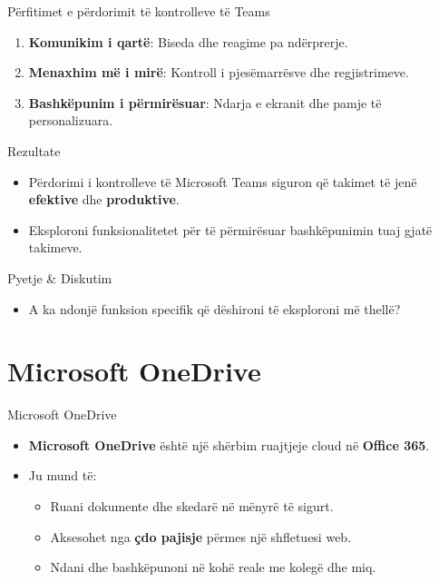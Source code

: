 \documentclass[
  ignorenonframetext,
]{beamer}
\providecommand{\tightlist}{%
  \setlength{\itemsep}{0pt}\setlength{\parskip}{0pt}}
\begin{document}
\begin{frame}{Përfitimet e përdorimit të kontrolleve të Teams}
\label{puxebrfitimet-e-puxebrdorimit-tuxeb-kontrolleve-tuxeb-teams}
\begin{enumerate}
\item
  \textbf{Komunikim i qartë}: Biseda dhe reagime pa ndërprerje.
\item
  \textbf{Menaxhim më i mirë}: Kontroll i pjesëmarrësve dhe
  regjistrimeve.
\item
  \textbf{Bashkëpunim i përmirësuar}: Ndarja e ekranit dhe pamje të
  personalizuara.
\end{enumerate}
\end{frame}

\begin{frame}{Rezultate}
\label{rezultate-6}
\begin{itemize}
\item
  Përdorimi i kontrolleve të Microsoft Teams siguron që takimet të jenë
  \textbf{efektive} dhe \textbf{produktive}.
\item
  Eksploroni funksionalitetet për të përmirësuar bashkëpunimin tuaj
  gjatë takimeve.
\end{itemize}
\end{frame}

\begin{frame}{Pyetje \& Diskutim}
\label{pyetje-diskutim-9}
\begin{itemize}
\tightlist
\item
  A ka ndonjë funksion specifik që dëshironi të eksploroni më thellë?
\end{itemize}
\end{frame}

\section{Microsoft OneDrive}\label{microsoft-onedrive}

\begin{frame}{Microsoft OneDrive}
\label{microsoft-onedrive-1}
\begin{itemize}
\item
  \textbf{Microsoft OneDrive} është një shërbim ruajtjeje cloud në
  \textbf{Office 365}.
\item
  Ju mund të:

  \begin{itemize}
  \item
    Ruani dokumente dhe skedarë në mënyrë të sigurt.
  \item
    Aksesohet nga \textbf{çdo pajisje} përmes një shfletuesi web.
  \item
    Ndani dhe bashkëpunoni në kohë reale me kolegë dhe miq.
  \end{itemize}
\end{itemize}
\end{frame}
\end{document}
